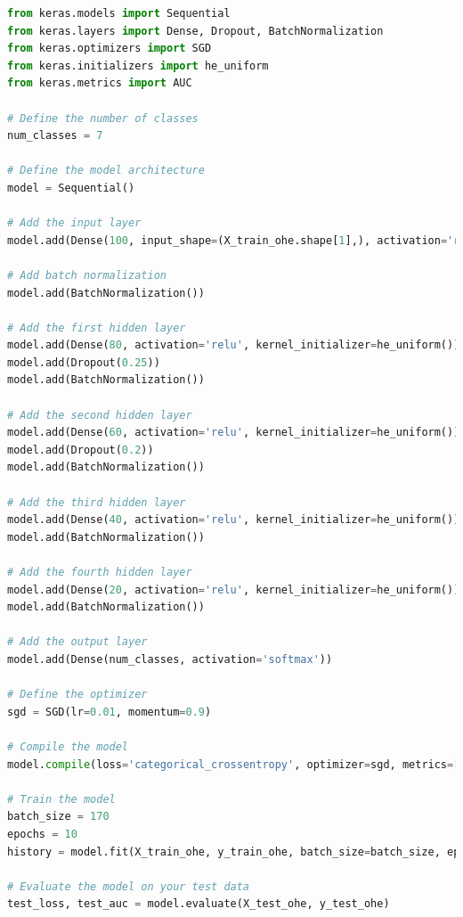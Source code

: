 \begin{appendices}
\begin{lstlisting}[language=Python]
from keras.models import Sequential
from keras.layers import Dense, Dropout, BatchNormalization
from keras.optimizers import SGD
from keras.initializers import he_uniform
from keras.metrics import AUC

# Define the number of classes
num_classes = 7

# Define the model architecture
model = Sequential()

# Add the input layer
model.add(Dense(100, input_shape=(X_train_ohe.shape[1],), activation='relu', kernel_initializer=he_uniform()))

# Add batch normalization
model.add(BatchNormalization())

# Add the first hidden layer
model.add(Dense(80, activation='relu', kernel_initializer=he_uniform()))
model.add(Dropout(0.25))
model.add(BatchNormalization())

# Add the second hidden layer
model.add(Dense(60, activation='relu', kernel_initializer=he_uniform()))
model.add(Dropout(0.2))
model.add(BatchNormalization())

# Add the third hidden layer
model.add(Dense(40, activation='relu', kernel_initializer=he_uniform()))
model.add(BatchNormalization())

# Add the fourth hidden layer
model.add(Dense(20, activation='relu', kernel_initializer=he_uniform()))
model.add(BatchNormalization())

# Add the output layer
model.add(Dense(num_classes, activation='softmax'))

# Define the optimizer
sgd = SGD(lr=0.01, momentum=0.9)

# Compile the model
model.compile(loss='categorical_crossentropy', optimizer=sgd, metrics=[AUC()])

# Train the model
batch_size = 170
epochs = 10
history = model.fit(X_train_ohe, y_train_ohe, batch_size=batch_size, epochs=epochs, validation_data=(X_test_ohe, y_test_ohe))

# Evaluate the model on your test data
test_loss, test_auc = model.evaluate(X_test_ohe, y_test_ohe)
\end{lstlisting}


\newpage

\end{appendices}


